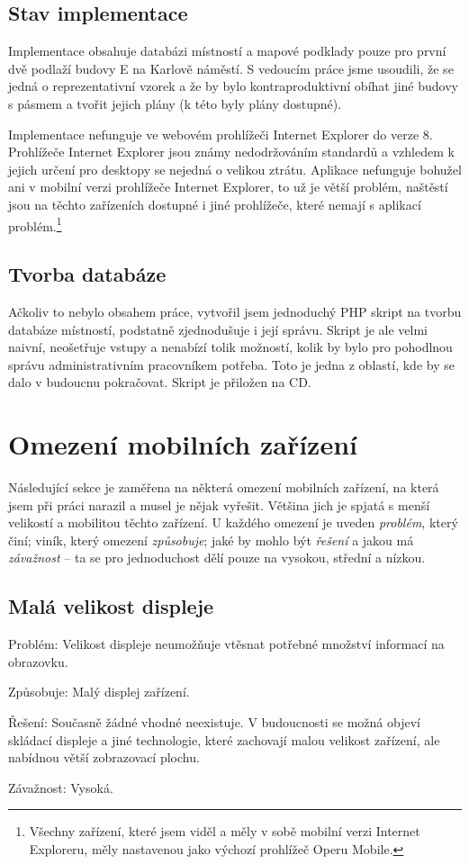 \subsection{Stav implementace}
Implementace obsahuje databázi místností a mapové podklady pouze pro první dvě podlaží budovy E na Karlově náměstí. S vedoucím práce jsme usoudili, že se jedná o reprezentativní vzorek a že by bylo kontraproduktivní obíhat jiné budovy s pásmem a tvořit jejich plány (k této byly plány dostupné).

Implementace nefunguje ve webovém prohlížeči Internet Explorer do verze 8. Prohlížeče Internet Explorer jsou známy nedodržováním standardů a vzhledem k jejich určení pro desktopy se nejedná o velikou ztrátu. Aplikace nefunguje bohužel ani v mobilní verzi prohlížeče Internet Explorer, to už je větší problém, naštěstí jsou na těchto zařízeních dostupné i jiné prohlížeče, které nemají s aplikací problém.\footnote{Všechny zařízení, které jsem viděl a měly v sobě mobilní verzi Internet Exploreru, měly nastavenou jako výchozí prohlížeč Operu Mobile.}

\subsection{Tvorba databáze}
Ačkoliv to nebylo obsahem práce, vytvořil jsem jednoduchý PHP skript na tvorbu databáze místností, podstatně zjednodušuje i její správu. Skript je ale velmi naivní, neošetřuje vstupy a nenabízí tolik možností, kolik by bylo pro pohodlnou správu administrativním pracovníkem potřeba. Toto je jedna z oblastí, kde by se dalo v budoucnu pokračovat. Skript je přiložen na CD.



\section{Omezení mobilních zařízení}
\label{sec:omezeniZarizeni}
Následující sekce je zaměřena na některá omezení mobilních zařízení, na která jsem při práci narazil a musel je nějak vyřešit. Většina jich je spjatá s menší velikostí a mobilitou těchto zařízení. U každého omezení je uveden \emph{problém}, který činí; viník, který omezení \emph{způsobuje}; jaké by mohlo být \emph{řešení} a jakou má \emph{závažnost} -- ta se pro jednoduchost dělí pouze na vysokou, střední a nízkou.
\subsection{Malá velikost displeje}
\begin{description*}
\item[Problém:] Velikost displeje neumožňuje vtěsnat potřebné množství informací na obrazovku.
\item[Způsobuje:] Malý displej zařízení.
\item[Řešení:] Současně žádné vhodné neexistuje. V budoucnosti se možná objeví skládací displeje a jiné technologie, které zachovají malou velikost zařízení, ale nabídnou větší zobrazovací plochu.
\item[Závažnost:] Vysoká.
\end{description*}


